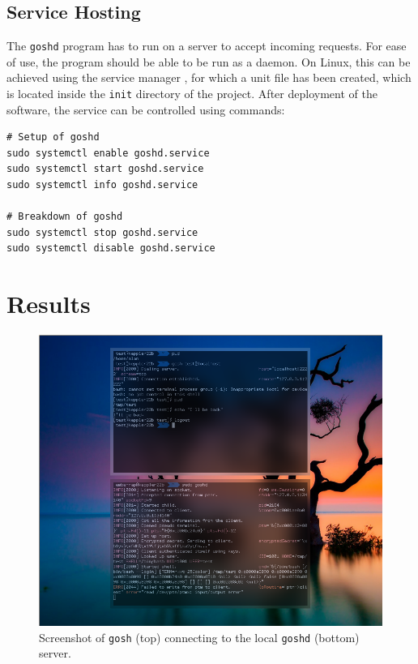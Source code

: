 \documentclass[10pt,a4paper,titlepage,twoside,english,final]{zhawreprt}
\begin{document}
\section{Service Hosting}\label{sec:ImplServiceHosting}
The \texttt{goshd} program has to run on a server to accept incoming requests.
For ease of use, the program should be able to be run as a \gls{daemon}.
On \gls{Linux}, this can be achieved using the service manager \cite{systemd}, for which a unit file has been created, which is located inside the \texttt{init} directory of the project.
After deployment of the software, the service can be controlled using \cite{systemd} commands:
\setlistingBash
\begin{lstlisting}[caption={\texttt{goshd} service control},label=lst:GoshdServiceCtl,deletekeywords={enable}]
# Setup of goshd
sudo systemctl enable goshd.service
sudo systemctl start goshd.service
sudo systemctl info goshd.service

# Breakdown of goshd
sudo systemctl stop goshd.service
sudo systemctl disable goshd.service
\end{lstlisting}


\chapter{Results}\label{chp:Results}
\begin{figure}[ht]
\includegraphics[width=\textwidth]{ohmygosh}
\caption{Screenshot of \texttt{gosh} (top) connecting to the local \texttt{goshd} (bottom) server.}
\label{fig:OhMyGoshScrot}
\end{figure}
\end{document}
